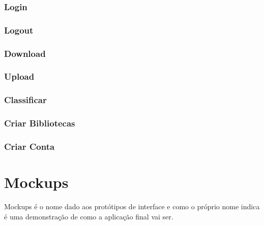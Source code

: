 \documentclass[a4paper]{report}
\begin{document}
\subsection{Login}

\subsection{Logout}

\subsection{Download}

\subsection{Upload}

\subsection{Classificar}

\subsection{Criar Bibliotecas}

\subsection{Criar Conta}

\chapter{Mockups}

Mockups é o nome dado aos protótipos de interface e como o próprio nome indica
é uma demonstração de como a aplicação final vai ser.
\end{document}
